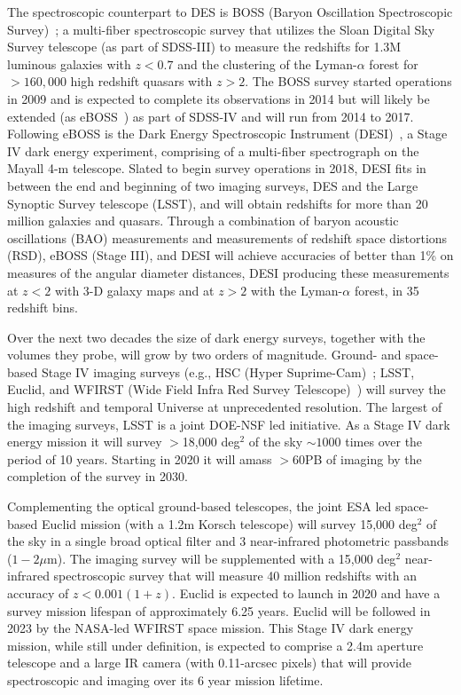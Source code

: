 The spectroscopic counterpart to DES is BOSS (Baryon Oscillation
Spectroscopic Survey)~\cite{boss}; a multi-fiber spectroscopic survey
that utilizes the Sloan Digital Sky Survey telescope (as part of
SDSS-III) to measure the redshifts for 1.3M luminous galaxies with
$z<0.7$ and the clustering of the Lyman-$\alpha$ forest for $>160,000$
high redshift quasars with $z>2$. The BOSS survey started operations
in 2009 and is expected to complete its observations in 2014 but will
likely be extended (as eBOSS~\cite{eboss}) as part of SDSS-IV and will
run from 2014 to 2017. Following eBOSS is the Dark Energy
Spectroscopic Instrument (DESI)~\cite{desi}, a Stage IV dark energy
experiment, comprising of a multi-fiber spectrograph on the Mayall 4-m
telescope. Slated to begin survey operations in 2018, DESI fits in
between the end and beginning of two imaging surveys, DES and the
Large Synoptic Survey telescope (LSST), and will obtain redshifts for
more than 20 million galaxies and quasars. Through a combination of
baryon acoustic oscillations (BAO) measurements and measurements of
redshift space distortions (RSD), eBOSS (Stage III), and DESI will
achieve accuracies of better than 1\% on measures of the angular
diameter distances, DESI producing these measurements at $z<2$ with
3-D galaxy maps and at $z>2$ with the Lyman-$\alpha$ forest, in 35
redshift bins.

Over the next two decades the size of dark energy surveys, together
with the volumes they probe, will grow by two orders of magnitude.
Ground- and space- based Stage IV imaging surveys (e.g., HSC (Hyper
Suprime-Cam)~\cite{hsc}; LSST\cite{lsst}, Euclid\cite{euclid}, and
WFIRST (Wide Field Infra Red Survey Telescope)~\cite{wfirst}) will
survey the high redshift and temporal Universe at unprecedented
resolution.  The largest of the imaging surveys, LSST is a joint
DOE-NSF led initiative. As a Stage IV dark energy mission it will
survey $>$18,000 deg$^{2}$ of the sky $\sim 1000$ times over the
period of 10 years. Starting in 2020 it will amass $>60$PB of imaging
by the completion of the survey in 2030.

Complementing the optical ground-based telescopes, the joint ESA led
space-based Euclid mission (with a 1.2m Korsch telescope) will survey
15,000 deg$^{2}$ of the sky in a single broad optical filter and 3
near-infrared photometric passbands ($1-2\mu$m). The imaging survey
will be supplemented with a 15,000 deg$^{2}$ near-infrared
spectroscopic survey that will measure 40 million redshifts with an
accuracy of $z < 0.001(1+z)$.  Euclid is expected to launch in 2020
and have a survey mission lifespan of approximately 6.25 years. Euclid
will be followed in 2023 by the NASA-led WFIRST space mission. This
Stage IV dark energy mission, while still under definition, is
expected to comprise a 2.4m aperture telescope and a large IR camera
(with 0.11-arcsec pixels) that will provide spectroscopic and imaging
over its 6 year mission lifetime.

